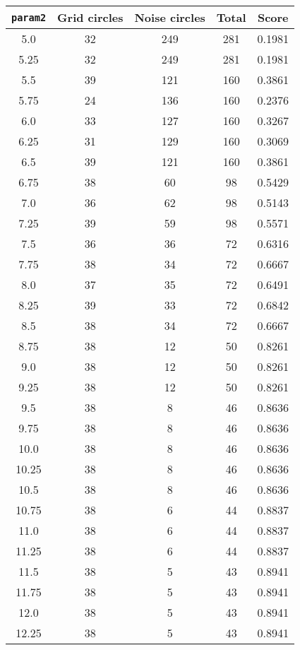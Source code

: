 \documentclass[letterpaper, 12pt]{article}
\begin{document}
\begin{longtable}{|c|c|c|c|c|}
\hline
\textbf{\texttt{param2}} & \textbf{Grid circles} & \textbf{Noise circles} & \textbf{Total} & \textbf{Score} \\
\hline
5.0 & 32 & 249 & 281 & 0.1981 \\
\hline
5.25 & 32 & 249 & 281 & 0.1981 \\
\hline
5.5 & 39 & 121 & 160 & 0.3861 \\
\hline
5.75 & 24 & 136 & 160 & 0.2376 \\
\hline
6.0 & 33 & 127 & 160 & 0.3267 \\
\hline
6.25 & 31 & 129 & 160 & 0.3069 \\
\hline
6.5 & 39 & 121 & 160 & 0.3861 \\
\hline
6.75 & 38 & 60 & 98 & 0.5429 \\
\hline
7.0 & 36 & 62 & 98 & 0.5143 \\
\hline
7.25 & 39 & 59 & 98 & 0.5571 \\
\hline
7.5 & 36 & 36 & 72 & 0.6316 \\
\hline
7.75 & 38 & 34 & 72 & 0.6667 \\
\hline
8.0 & 37 & 35 & 72 & 0.6491 \\
\hline
8.25 & 39 & 33 & 72 & 0.6842 \\
\hline
8.5 & 38 & 34 & 72 & 0.6667 \\
\hline
8.75 & 38 & 12 & 50 & 0.8261 \\
\hline
9.0 & 38 & 12 & 50 & 0.8261 \\
\hline
9.25 & 38 & 12 & 50 & 0.8261 \\
\hline
9.5 & 38 & 8 & 46 & 0.8636 \\
\hline
9.75 & 38 & 8 & 46 & 0.8636 \\
\hline
10.0 & 38 & 8 & 46 & 0.8636 \\
\hline
10.25 & 38 & 8 & 46 & 0.8636 \\
\hline
10.5 & 38 & 8 & 46 & 0.8636 \\
\hline
10.75 & 38 & 6 & 44 & 0.8837 \\
\hline
11.0 & 38 & 6 & 44 & 0.8837 \\
\hline
11.25 & 38 & 6 & 44 & 0.8837 \\
\hline
11.5 & 38 & 5 & 43 & 0.8941 \\
\hline
11.75 & 38 & 5 & 43 & 0.8941 \\
\hline
12.0 & 38 & 5 & 43 & 0.8941 \\
\hline
12.25 & 38 & 5 & 43 & 0.8941 \\
\hline

\end{longtable}
\end{document}
